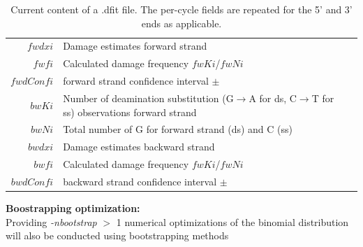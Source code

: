 \documentclass[10pt]{article}
\begin{document}
\begin{table}[h]
\begin{tabular}{rll}
  {\sf $fwdxi$} & Damage estimates forward strand \\
  {\sf $fwfi$} & Calculated damage frequency $fwKi$/$fwNi$\\
  {\sf $fwdConfi$} & forward strand confidence interval $\pm$\\
  {\sf $bwKi$} & Number of deamination substitution (G$\rightarrow$A for ds, C$\rightarrow$T for ss) observations forward strand \\
  {\sf $bwNi$} & Total number of G for forward strand (ds) and C (ss)\\
  {\sf $bwdxi$} & Damage estimates backward strand \\
  {\sf $bwfi$} & Calculated damage frequency $fwKi$/$fwNi$\\
  {\sf $bwdConfi$} & backward strand confidence interval $\pm$\\ \hline
\end{tabular}\label{tab3}
  \caption{Current content of a .dfit file. The per-cycle fields are repeated
  for the 5' and 3' ends as applicable.}
\end{table}
\pagebreak
\noindent
\textbf{Boostrapping optimization:} \\ \noindent
Providing \textit{-nbootstrap} $>$ 1 numerical optimizations of the binomial distribution will also be conducted using bootstrapping methods
\end{document}
